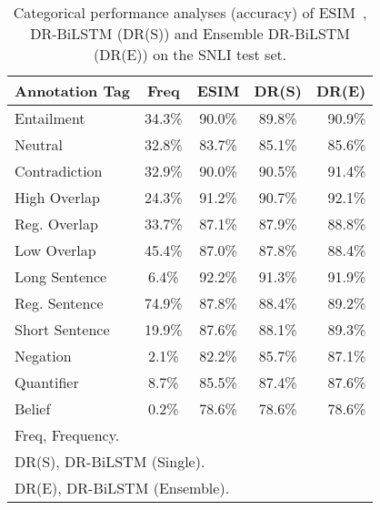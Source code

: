 \documentclass[11pt,a4paper]{article}
\begin{document}
	
	\begin{table}[t]
		\centering
		\small
		\begin{tabular}{lcccr}
			\hline
			Annotation Tag & Freq & ESIM & DR(S) & DR(E) \\
			\hline \hline
			Entailment & 34.3\% & 90.0\% & 89.8\% & 90.9\% \\
			Neutral & 32.8\% & 83.7\% & 85.1\% & 85.6\% \\
			Contradiction & 32.9\% & 90.0\% & 90.5\% & 91.4\% \\ \hline
			High Overlap & 24.3\% & 91.2\% & 90.7\% & 92.1\% \\
			Reg. Overlap & 33.7\% & 87.1\% & 87.9\% & 88.8\% \\
			Low Overlap & 45.4\% & 87.0\% & 87.8\% & 88.4\% \\ \hline
			Long Sentence & 6.4\%  & 92.2\% & 91.3\% & 91.9\% \\
			Reg. Sentence & 74.9\% & 87.8\% & 88.4\% & 89.2\% \\
			Short Sentence & 19.9\% & 87.6\% & 88.1\% & 89.3\% \\ \hline
			Negation & 2.1\% & 82.2\% & 85.7\% & 87.1\% \\
			Quantifier & 8.7\% & 85.5\% & 87.4\% & 87.6\% \\
Belief & 0.2\% & 78.6\% & 78.6\% & 78.6\% \\
			\hline \hline
			\multicolumn{5}{l}{Freq, Frequency.} \\
			\multicolumn{5}{l}{DR(S), DR-BiLSTM (Single).} \\
			\multicolumn{5}{l}{DR(E), DR-BiLSTM (Ensemble).} \\ \hline
		\end{tabular}
		\caption{\label{tab:snli:deep:analz} Categorical performance analyses (accuracy) of ESIM~\cite{him2017}, DR-BiLSTM (DR(S)) and Ensemble DR-BiLSTM (DR(E)) on the SNLI test set.}
	\end{table}	
	
\end{document}
